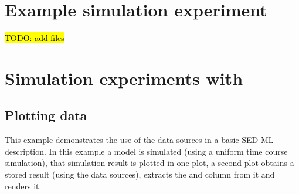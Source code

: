 \section{Example simulation experiment}
\hl{TODO: add files}

%
%
%
%
%
%

\section{Simulation experiments with }

\subsection{Plotting data}
This example demonstrates the use of the data sources in a basic SED-ML description. In this example a model is simulated (using a uniform time course simulation), that simulation result is plotted in one plot, a second plot obtains a stored result (using the data sources), extracts the  and  column from it and renders it.

